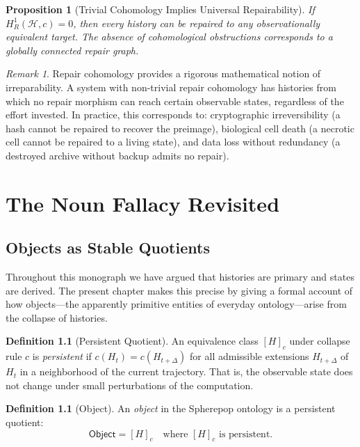 \documentclass[12pt, a4paper, openany]{book}
\theoremstyle{plain}
\newtheorem{proposition}[theorem]{Proposition}
\theoremstyle{definition}
\newtheorem{definition}[theorem]{Definition}
\theoremstyle{remark}
\newtheorem{remark}[theorem]{Remark}
\newcommand{\calH}{\mathcal{H}}
\begin{document}
\begin{proposition}[Trivial Cohomology Implies Universal Repairability]
If $H^1_R(\calH, c) = 0$, then every history can be repaired to any
observationally equivalent target. The absence of cohomological obstructions
corresponds to a globally connected repair graph.
\end{proposition}

\begin{remark}
Repair cohomology provides a rigorous mathematical notion of irreparability.
A system with non-trivial repair cohomology has histories from which no
repair morphism can reach certain observable states, regardless of the effort
invested. In practice, this corresponds to: cryptographic irreversibility
(a hash cannot be repaired to recover the preimage), biological cell death
(a necrotic cell cannot be repaired to a living state), and data loss without
redundancy (a destroyed archive without backup admits no repair).
\end{remark}

\chapter{The Noun Fallacy Revisited}

\section{Objects as Stable Quotients}

Throughout this monograph we have argued that histories are primary and states
are derived. The present chapter makes this precise by giving a formal account
of how objects---the apparently primitive entities of everyday ontology---arise
from the collapse of histories.

\begin{definition}[Persistent Quotient]
An equivalence class $[H]_c$ under collapse rule $c$ is \emph{persistent} if
$c(H_t) = c(H_{t+\Delta})$ for all admissible extensions $H_{t+\Delta}$ of $H_t$
in a neighborhood of the current trajectory. That is, the observable state does
not change under small perturbations of the computation.
\end{definition}

\begin{definition}[Object]
An \emph{object} in the Spherepop ontology is a persistent quotient:
\[
\mathsf{Object} = [H]_c \quad \text{where } [H]_c \text{ is persistent.}
\]
\end{definition}
\end{document}
